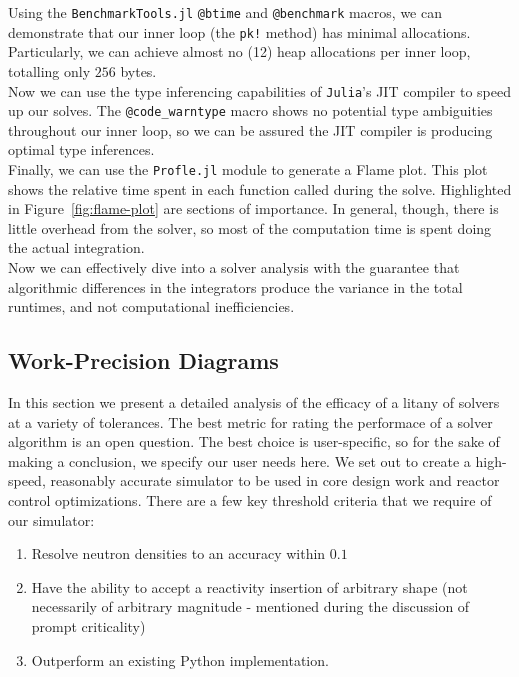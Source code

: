 \documentclass[review,onefignum,onetabnum]{siamart171218}
\begin{document}
Using the \texttt{BenchmarkTools.jl} \texttt{@btime} and \texttt{@benchmark} macros,
we can demonstrate that our inner loop (the \texttt{pk!} method) has minimal allocations.
Particularly, we can achieve almost no (12) heap allocations per inner loop, totalling
only $256$ bytes. \\

Now we can use the type inferencing capabilities of \texttt{Julia}'s JIT compiler
to speed up our solves. The \texttt{@code\_warntype} macro shows no potential type
ambiguities throughout our inner loop, so we can be assured the JIT compiler is
producing optimal type inferences. \\

Finally, we can use the \texttt{Profle.jl} module to generate a Flame plot. This
plot shows the relative time spent in each function called during the solve. Highlighted
in Figure~\cref{fig:flame-plot} are sections of importance. In general, though,
there is little overhead from the solver, so most of the computation time is spent
doing the actual integration.\\

Now we can effectively dive into a solver analysis with the guarantee that algorithmic
differences in the integrators produce the variance in the total runtimes, and not
computational inefficiencies.

\subsection{Work-Precision Diagrams}
In this section we present a detailed analysis of the efficacy of a litany of solvers
at a variety of tolerances. The best metric for rating the performace of a solver algorithm
is an open question. The best choice is user-specific, so for the sake of making a
conclusion, we specify our user needs here. We set out to create a high-speed,
reasonably accurate simulator to be used in core design work and reactor control
optimizations. There are a few key threshold criteria that we require of our simulator:\\

\begin{enumerate}
  \item Resolve neutron densities to an accuracy within $0.1$
  \item Have the ability to accept a reactivity insertion of arbitrary shape
  (not necessarily of arbitrary magnitude - mentioned during the discussion of prompt
  criticality)
  \item Outperform an existing Python implementation.
\end{enumerate}
\end{document}
